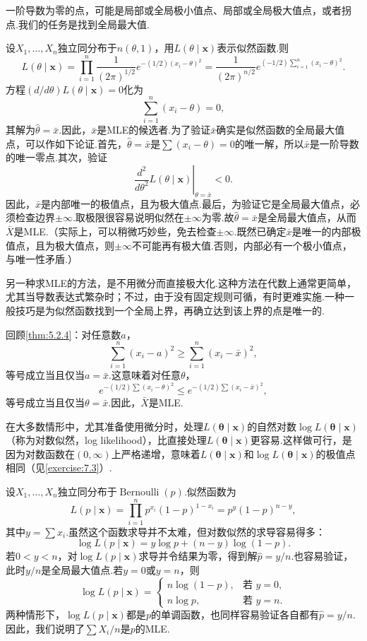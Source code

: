 一阶导数为零的点，可能是局部或全局极小值点、局部或全局极大值点，或者拐点.我们的任务是找到全局最大值.
\begin{example}[正态似然]\label{ex:7.2.5}
设$X_1,\ldots,X_n$独立同分布于$n(\theta,1)$，用$L(\theta\mid\boldsymbol x)$表示似然函数.则
$$L(\theta\mid\boldsymbol x)=\prod_{i=1}^n\frac1{(2\pi)^{1/2}}e^{-(1/2)(x_i-\theta)^2}=\frac1{(2\pi)^{n/2}}e^{(-1/2)\sum_{i=1}^n(x_i-\theta)^2}.$$
方程$(d/d\theta)L(\theta\mid\boldsymbol x)=0$化为
$$\sum_{i=1}^n(x_i-\theta)=0,$$
其解为$\widehat\theta=\bar x$.因此，$\bar x$是MLE的候选者.为了验证$\bar x$确实是似然函数的全局最大值点，可以作如下论证.首先，$\widehat\theta=\bar x$是$\sum(x_i-\theta)=0$的唯一解，所以$\bar x$是一阶导数的唯一零点.其次，验证
$$\left.\frac{d^2}{d\theta^2}L(\theta\mid\boldsymbol x)\right|_{\theta=\bar x}<0.$$
因此，$\bar x$是内部唯一的极值点，且为极大值点.最后，为验证它是全局最大值点，必须检查边界$\pm\infty$.取极限很容易说明似然在$\pm\infty$为零.故$\widehat\theta=\bar x$是全局最大值点，从而$\bar X$是MLE.（实际上，可以稍微巧妙些，免去检查$\pm\infty$.既然已确定$\bar x$是唯一的内部极值点，且为极大值点，则$\pm\infty$不可能再有极大值.否则，内部必有一个极小值点，与唯一性矛盾.）
\end{example}
另一种求MLE的方法，是不用微分而直接极大化.这种方法在代数上通常更简单，尤其当导数表达式繁杂时；不过，由于没有固定规则可循，有时更难实施.一种一般技巧是为似然函数找到一个全局上界，再确立达到该上界的点是唯一的.
\begin{example}[续\autoref{ex:7.2.5}]\label{ex:7.2.6}
回顾\autoref{thm:5.2.4}：对任意数$a$，
$$\sum_{i=1}^n(x_i-a)^2\ge\sum_{i=1}^n(x_i-\bar x)^2,$$
等号成立当且仅当$a=\bar x$.这意味着对任意$\theta$，
$$e^{-(1/2)\sum(x_i-\theta)^2}\le e^{-(1/2)\sum(x_i-\bar x)^2},$$
等号成立当且仅当$\theta=\bar x$.因此，$\bar X$是MLE.
\end{example}
在大多数情形中，尤其准备使用微分时，处理$L(\boldsymbol\theta\mid\boldsymbol x)$的自然对数$\log L(\boldsymbol\theta\mid\boldsymbol x)$（称为对数似然，log likelihood），比直接处理$L(\boldsymbol\theta\mid\boldsymbol x)$更容易.这样做可行，是因为对数函数在$(0,\infty)$上严格递增，意味着$L(\boldsymbol\theta\mid\boldsymbol x)$和$\log L(\boldsymbol\theta\mid\boldsymbol x)$的极值点相同（见\autoref{exercise:7.3}）.
\begin{example}[Bernoulli分布的MLE]\label{ex:7.2.7}
设$X_1,\ldots,X_n$独立同分布于$\operatorname{Bernoulli}(p)$.似然函数为
$$L(p\mid\boldsymbol x)=\prod_{i=1}^np^{x_i}(1-p)^{1-x_i}=p^y(1-p)^{n-y},$$
其中$y=\sum x_i$.虽然这个函数求导并不太难，但对数似然的求导容易得多：
$$\log L(p\mid\boldsymbol x)=y\log p+(n-y)\log(1-p).$$
若$0<y<n$，对$\log L(p\mid\boldsymbol x)$求导并令结果为零，得到解$\widehat p=y/n$.也容易验证，此时$y/n$是全局最大值点.若$y=0$或$y=n$，则
$$\log L(p\mid\boldsymbol x)=\begin{cases}n\log(1-p),&\text{若 }y=0,\\n\log p,&\text{若 }y=n.\end{cases}$$
两种情形下，$\log L(p\mid\boldsymbol x)$都是$p$的单调函数，也同样容易验证各自都有$\widehat p=y/n$.因此，我们说明了$\sum X_i/n$是$p$的MLE.
\end{example}
